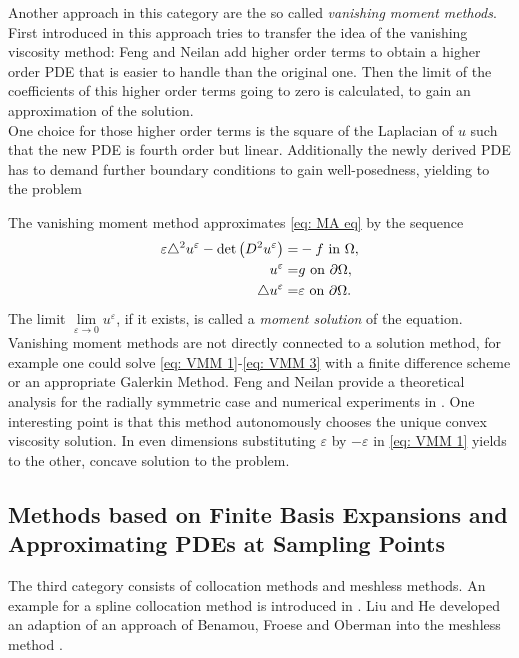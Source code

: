 Another approach in this category are the so called \emph{vanishing moment methods}. First introduced in \cite{FN2009} this approach tries to transfer the idea of the vanishing viscosity method: Feng and Neilan add higher order terms to obtain a higher order PDE that is easier to handle than the original one. Then the limit of the coefficients of this higher order terms going to zero is calculated, to gain an approximation of the \MA solution. \\
One choice for those higher order terms is the square of the Laplacian of $u$ such that the new PDE is fourth order but linear. Additionally the newly derived PDE has to demand further boundary conditions to gain well-posedness, yielding to the problem
\begin{definition}
	The vanishing moment method approximates \eqref{eq: MA eq} by the sequence
	\begin{align}
		\varepsilon \triangle^2 u^\varepsilon - \det{\left(D^2 u^\varepsilon\right)} =& -f \text{ in } \Omega, \label{eq: VMM 1}\\ 
		u^\varepsilon =& g \text{ on } \partial \Omega, \label{eq: VMM 2}\\
		\triangle u^\varepsilon = & \varepsilon \text{ on } \partial \Omega. \label{eq: VMM 3}
	\end{align}
The limit $\lim\limits_{\varepsilon \rightarrow 0 } u^\varepsilon$, if it exists, is called a \emph{moment solution} of the \MA equation.
Vanishing moment methods are not directly connected to a solution method, for example one could solve \eqref{eq: VMM 1}-\eqref{eq: VMM 3} with a finite difference scheme or an appropriate Galerkin Method.
Feng and Neilan provide a theoretical analysis for the radially symmetric case and numerical experiments in \cite{FN2009, Neilan2010, FN2011a}. One interesting point is that this method autonomously chooses the unique convex viscosity solution. In even dimensions substituting $\varepsilon$ by $-\varepsilon$ in  \eqref{eq: VMM 1} yields to the other, concave solution to the \MA problem.  
\end{definition}


\subsection{Methods based on Finite Basis Expansions and Approximating PDEs at Sampling Points}
The third category consists of collocation methods and meshless methods.
An example for a spline collocation method is introduced in \cite{BHP2014}. 
Liu and He developed an adaption of an approach of Benamou, Froese and Oberman into the meshless method \cite{LH2013}.
